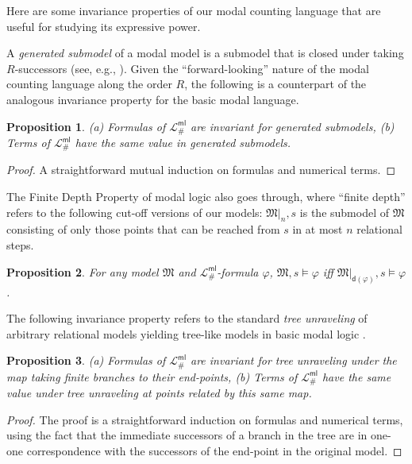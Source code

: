 \documentclass[12pt,oneside,reqno]{amsart}
\newtheorem{proposition}{Proposition}
\theoremstyle{definition}
\begin{document}
Here are some invariance properties of our modal counting language that are useful for studying its expressive power.

A \emph{generated submodel} of a modal model is a submodel that is closed under taking $R$-successors (see, e.g., \citealt{Blackburn2001}). Given the ``forward-looking'' nature of the modal counting language along the order $R$, the following is a counterpart of the analogous invariance property for the basic modal language.

\begin{proposition} \mbox{(a)} Formulas of $\mathcal{L}_\#^{\mathsf{ml}}$ are invariant for generated submodels, \mbox{(b)} Terms of $\mathcal{L}_\#^{\mathsf{ml}}$  have the same value in generated submodels.
\end{proposition}

\begin{proof} A straightforward mutual induction on formulas and numerical terms. \end{proof}

The  Finite Depth Property of modal logic  also goes through, where ``finite depth'' refers to the following cut-off versions of our models: $\mathfrak{M}|_n, s$ is the submodel of $\mathfrak{M}$ consisting of only those points that can be reached from $s$ in at most $n$ relational steps.

\begin{proposition} For any model $\mathfrak{M}$ and $\mathcal{L}_\#^{\mathsf{ml}}$-formula $\varphi$, $\mathfrak{M}, s \models \varphi$ iff  $\mathfrak{M}|_{\mathsf{d}(\varphi)}, s \models \varphi$. %
\end{proposition}

The following invariance property refers to the standard \emph{tree unraveling}  of arbitrary relational models yielding  tree-like models in basic modal logic \citep{Blackburn2001}.

\begin{proposition} (a) Formulas of $\mathcal{L}_\#^{\mathsf{ml}}$ are invariant for tree unraveling under the map taking finite branches to their end-points, (b) Terms of $\mathcal{L}_\#^{\mathsf{ml}}$  have the same value under tree unraveling at points related by this same map.
\end{proposition}

\begin{proof} The proof is a straightforward induction on formulas and numerical terms, using the fact that the immediate successors of a branch in the tree are in one-one correspondence with the successors of the end-point in the original model.  \end{proof}
\end{document}
